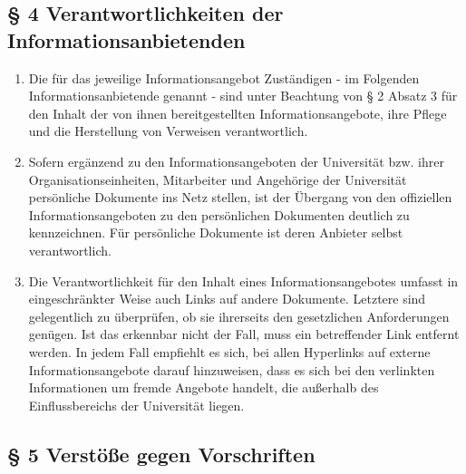 \subsection*{§ 4 Verantwortlichkeiten der Informationsanbietenden}
\begin{enumerate}
\item Die für das jeweilige Informationsangebot Zuständigen - im Folgenden Informationsanbietende genannt - sind unter Beachtung von § 2 Absatz 3 für den Inhalt der von ihnen bereitgestellten Informationsangebote, ihre Pflege und die Herstellung von Verweisen verantwortlich.
\item Sofern ergänzend zu den Informationsangeboten der Universität bzw. ihrer Organisationseinheiten, Mitarbeiter und Angehörige der Universität persönliche Dokumente ins Netz stellen, ist der Übergang von den offiziellen Informationsangeboten zu den persönlichen Dokumenten deutlich zu kennzeichnen. Für persönliche Dokumente ist deren Anbieter selbst verantwortlich.
\item Die Verantwortlichkeit für den Inhalt eines Informationsangebotes umfasst in eingeschränkter Weise auch Links auf andere Dokumente. Letztere sind gelegentlich zu überprüfen, ob sie ihrerseits den gesetzlichen Anforderungen genügen. Ist das erkennbar nicht der Fall, muss ein betreffender Link entfernt werden.
In jedem Fall empfiehlt es sich, bei allen Hyperlinks auf externe Informationsangebote darauf hinzuweisen, dass es sich bei den verlinkten Informationen um fremde Angebote handelt, die außerhalb des Einflussbereichs der Universität liegen.
\end{enumerate}
\subsection*{§ 5 Verstöße gegen Vorschriften}

